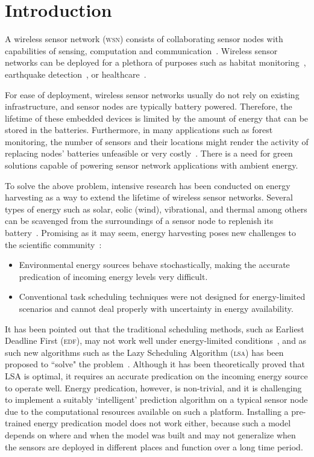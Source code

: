 \section{Introduction}\label{sec:introduction}

A wireless sensor network (\textsc{wsn}) consists of collaborating sensor nodes with capabilities of sensing, computation and communication~\cite{sudevalyam2010energy}. Wireless sensor networks can be deployed for a plethora of purposes such as habitat monitoring~\cite{mainwaring2002wireless}, earthquake detection~\cite{suzuki2007earthquake}, or healthcare~\cite{saadaoui2007architecture}. 

For ease of deployment, wireless sensor networks usually do not rely on existing infrastructure, and sensor nodes are typically battery powered. Therefore, the lifetime of these embedded devices is limited by the amount of energy that can be stored in the batteries. Furthermore, in many applications such as forest monitoring, the number of sensors and their locations might render the activity of replacing nodes' batteries unfeasible or very costly~\cite{moser2007real}. 
There is a need for green solutions capable of powering sensor network applications 
with ambient energy. 

To solve the above problem, intensive research has been conducted on energy harvesting as a way to extend the lifetime of wireless sensor networks. Several types of energy such as solar, eolic (wind), vibrational, and thermal among others can be scavenged from the surroundings of a sensor node to replenish its battery~\cite{roundy2004power}. Promising as it may seem, energy harvesting poses new challenges to the scientific community~\cite{lu2010accurate}:

\begin{itemize}
	\item Environmental energy sources behave stochastically, making the accurate predication of incoming energy levels very difficult.
	\item Conventional task scheduling techniques were not designed for energy-limited scenarios and cannot deal properly with uncertainty in energy availability.
\end{itemize}

It has been pointed out that the traditional scheduling methods, such as Earliest Deadline First (\textsc{edf}), may not work well under energy-limited conditions~\cite{moser2007real}, and as such new algorithms such as the Lazy Scheduling Algorithm (\textsc{lsa}) has been proposed to ``solve" the problem~\cite{moser2007real}. 
Although it has been theoretically proved that LSA is optimal, it requires an accurate predication on the incoming energy source to operate well. 
Energy predication, however, is non-trivial, and it is challenging 
to implement a suitably `intelligent'  prediction algorithm 
on a typical sensor node due to the computational resources available on such a platform. 
Installing a pre-trained energy predication model does not work either, 
because such a model depends on where and when the model was built and may 
not generalize when the sensors are deployed in different places and 
function over a long time period. 

